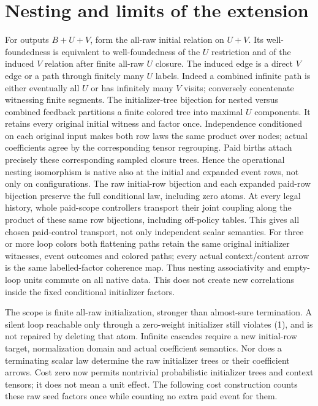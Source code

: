 \documentclass[11pt]{article}
\begin{document}
\section{Nesting and limits of the extension}
For outputs $B+U+V$, form the all-raw initial relation on $U+V$. Its well-foundedness is equivalent to well-foundedness of the $U$ restriction and of the induced $V$ relation after finite all-raw $U$ closure. The induced edge is a direct $V$ edge or a path through finitely many $U$ labels. Indeed a combined infinite path is either eventually all $U$ or has infinitely many $V$ visits; conversely concatenate witnessing finite segments. The initializer-tree bijection for nested versus combined feedback partitions a finite colored tree into maximal $U$ components. It retains every original initial witness and factor once. Independence conditioned on each original input makes both row laws the same product over nodes; actual coefficients agree by the corresponding tensor regrouping. Paid births attach precisely these corresponding sampled closure trees. Hence the operational nesting isomorphism is native also at the initial and expanded event rows, not only on configurations. The raw initial-row bijection and each expanded paid-row bijection preserve the full conditional law, including zero atoms. At every legal history, whole paid-scope controllers transport their joint coupling along the product of these same row bijections, including off-policy tables. This gives all chosen paid-control transport, not only independent scalar semantics. For three or more loop colors both flattening paths retain the same original initializer witnesses, event outcomes and colored paths; every actual context/content arrow is the same labelled-factor coherence map. Thus nesting associativity and empty-loop units commute on all native data. This does not create new correlations inside the fixed conditional initializer factors.

The scope is finite all-raw initialization, stronger than almost-sure termination. A silent loop reachable only through a zero-weight initializer still violates (1), and is not repaired by deleting that atom. Infinite cascades require a new initial-row target, normalization domain and actual coefficient semantics. Nor does a terminating scalar law determine the raw initializer trees or their coefficient arrows. Cost zero now permits nontrivial probabilistic initializer trees and context tensors; it does not mean a unit effect. The following cost construction counts these raw seed factors once while counting no extra paid event for them.
\end{document}
